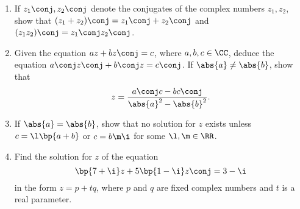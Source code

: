 \clearpage
\begin{problem}
    \begin{enumerate}
        \item If $z_1\conj, z_2\conj$ denote the conjugates of the complex numbers $z_1, z_2$, show that $(z_1 + z_2)\conj = z_1\conj + z_2\conj$ and $(z_1z_2)\conj = z_1\conj z_2\conj$.
        \item Given the equation $az + bz\conj = c$, where $a, b , c \in \CC$, deduce the equation $a\conj z\conj + b\conj z = c\conj$. If $\abs{a} \neq \abs{b}$, show that \[z = \frac{a\conj c - b c\conj}{\abs{a}^2 - \abs{b}^2}.\]
        \item If $\abs{a} = \abs{b}$, show that no solution for $z$ exists unless $c = \l\bp{a + b}$ or $c = b \m \i$ for some $\l, \m \in \RR$.
        \item Find the solution for $z$ of the equation \[\bp{7 + \i} z + 5\bp{1 - \i} z\conj = 3 - \i\] in the form $z = p + tq$, where $p$ and $q$ are fixed complex numbers and $t$ is a real parameter.
    \end{enumerate}
\end{problem}
